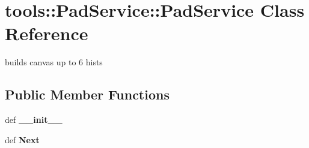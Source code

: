 \hypertarget{classtools_1_1PadService_1_1PadService}{
\section{tools::PadService::PadService Class Reference}
\label{classtools_1_1PadService_1_1PadService}
}
builds canvas up to 6 hists  


\subsection*{Public Member Functions}
\begin{CompactItemize}
\item 
\hypertarget{classtools_1_1PadService_1_1PadService_1a9f48ad85e894de996666ca2c6e1f9d}{
def \textbf{\_\-\_\-init\_\-\_\-}}
\label{classtools_1_1PadService_1_1PadService_1a9f48ad85e894de996666ca2c6e1f9d}

\item 
\hypertarget{classtools_1_1PadService_1_1PadService_273e402a3566dc6818fe681e1c3b4a0c}{
def \textbf{Next}}
\label{classtools_1_1PadService_1_1PadService_273e402a3566dc6818fe681e1c3b4a0c}

\end{CompactItemize}
